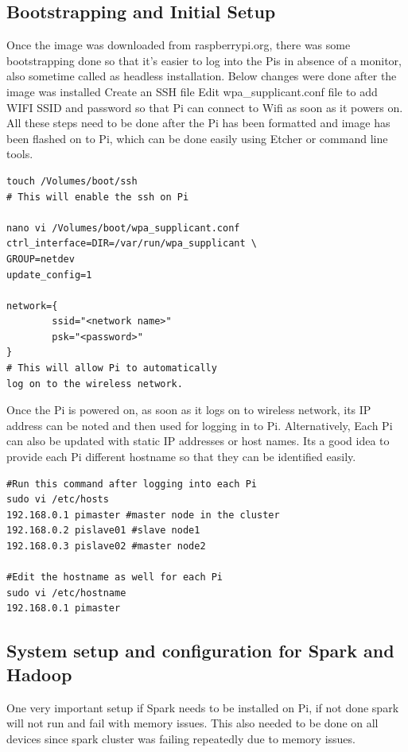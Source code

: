 \subsection{Bootstrapping and Initial Setup}
Once the image was downloaded from raspberrypi.org, there was some bootstrapping done so that it's easier to log into the Pis in absence of a monitor, also sometime called as headless installation.
Below changes were done after the image was installed
Create an SSH file
Edit wpa\_supplicant.conf file to add WIFI SSID and password so that
Pi can connect to Wifi as soon as it powers on. All these steps need
to be done after the Pi has been formatted and image has been flashed
on to Pi, which can be done easily using Etcher or command line tools.

\begin{verbatim}
touch /Volumes/boot/ssh
# This will enable the ssh on Pi

nano vi /Volumes/boot/wpa_supplicant.conf
ctrl_interface=DIR=/var/run/wpa_supplicant \
GROUP=netdev
update_config=1

network={
        ssid="<network name>"
        psk="<password>"
}
# This will allow Pi to automatically 
log on to the wireless network.

\end{verbatim}

Once the Pi is powered on, as soon as it logs on to wireless network, its IP address can be noted and then used for logging in to Pi. Alternatively, Each Pi can also be updated with static IP addresses or host names. Its a good idea to provide each Pi different hostname so that they can be identified easily. 

\begin{verbatim}
#Run this command after logging into each Pi
sudo vi /etc/hosts
192.168.0.1 pimaster #master node in the cluster
192.168.0.2 pislave01 #slave node1 
192.168.0.3 pislave02 #master node2 

#Edit the hostname as well for each Pi
sudo vi /etc/hostname
192.168.0.1	pimaster
\end{verbatim}

\subsection{System setup and configuration for Spark and Hadoop}
One very important setup if Spark needs to be installed on Pi, if not done spark will not run and fail with memory issues. This also needed to be done on all devices since spark cluster was failing repeatedly due to memory issues.

